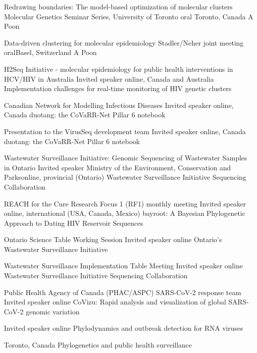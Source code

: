 {Redrawing boundaries: The model-based optimization of molecular clusters}
{Molecular Genetics Seminar Series, University of Toronto}
{oral}
{Toronto, Canada}
{A Poon}{}

{Data-driven clustering for molecular epidemiology}
{Stadler/Neher joint meeting}
{oral}{Basel, Switzerland}
{A Poon}{}

{H2Seq Initiative - molecular epidemiology for public health interventions in HCV/HIV in Australia}
{Invited speaker}
{}{online, Canada and Australia}
{Implementation challenges for real-time monitoring of HIV genetic clusters}

{Canadian Network for Modelling Infectious Diseases}
{Invited speaker}
{}{online, Canada}
{duotang: the CoVaRR-Net Pillar 6 notebook}

{Presentation to the VirusSeq development team}
{Invited speaker}
{}{online, Canada}
{duotang: the CoVaRR-Net Pillar 6 notebook}

{Wastewater Surveillance Initiative: Genomic Sequencing of Wastewater Samples in Ontario}
{Invited speaker}
{Ministry of the Environment, Conservation and Parks}{online, provincial (Ontario)}
{Wastewater Surveillance Initiative Sequencing Collaboration}

{REACH for the Cure Research Focus 1 (RF1) monthly meeting}
{Invited speaker}
{}{online, international (USA, Canada, Mexico)}
{bayroot: A Bayesian Phylogenetic Approach to Dating HIV Reservoir Sequences}

{Ontario Science Table Working Session}
{Invited speaker}
{}{online}
{Ontario's Wastewater Surveillance Initiative}


{Wastewater Surveillance Implementation Table Meeting}
{Invited speaker}
{}{online}
{Wastewater Surveillance Initiative Sequencing Collaboration}


{Public Health Agency of Canada (PHAC/ASPC) SARS-CoV-2 response team}
{Invited speaker}
{}{online}
{CoVizu: Rapid analysis and visualization of global SARS-CoV-2 genomic variation}

{Invited speaker}
{}{online}
{Phylodynamics and outbreak detection for RNA viruses}

{}{Toronto, Canada}
{Phylogenetics and public health surveillance}

